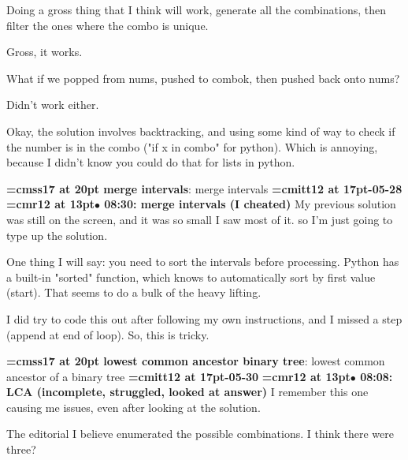 Doing a gross thing that I think will work, generate all the combinations, then filter the ones where the combo is unique.
\par

Gross, it works.
\par

What if we popped from nums, pushed to combok, then pushed back onto nums?
\par

Didn't work either.
\par

Okay, the solution involves backtracking, and using some kind of way to check if the number is in the combo ("if x in combo" for python). Which is annoying, because I didn't know you could do that for lists in python.
\par

{\medskip\noindent\bf\font\titlefont=cmss17 at 20pt merge intervals}: merge intervals
{\medskip\noindent\bf\font\titlefont=cmitt12 at 17pt-05-28}\medskip
{\smallskip\noindent\bf\font\titlefont=cmr12 at 13pt\titlefont $\bullet$ 08:30: merge intervals (I cheated)}\smallskip
My previous solution was still on the screen, and it was so small I saw most of it. so I'm just going to type up the solution.
\par

One thing I will say: you need to sort the intervals before processing. Python has a built-in "sorted" function, which knows to automatically sort by first value (start). That seems to do a bulk of the heavy lifting.
\par

I did try to code this out after following my own instructions, and I missed a step (append at end of loop). So, this is tricky.
\par

{\medskip\noindent\bf\font\titlefont=cmss17 at 20pt lowest common ancestor binary tree}: lowest common ancestor of a binary tree
{\medskip\noindent\bf\font\titlefont=cmitt12 at 17pt-05-30}\medskip
{\smallskip\noindent\bf\font\titlefont=cmr12 at 13pt\titlefont $\bullet$ 08:08: LCA (incomplete, struggled, looked at answer)}\smallskip
I remember this one causing me issues, even after looking at the solution.
\par

The editorial I believe enumerated the possible combinations. I think there were three?
\par

